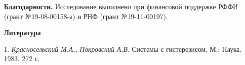 \hspace{-1.3pt}\textbf{Благодарности.}\hspace{-1pt} Исследование выполнено при финансо\-вой поддержке РФФИ (грант №19-08-00158-а) и РНФ (грант №19-11-00197).

\smallskip \centerline {\bf Литература} \nopagebreak

1. {\it Красносельский М.А., Покровский А.В.} Системы с гистерезисом. М.: Наука, 1983. 272 с.
